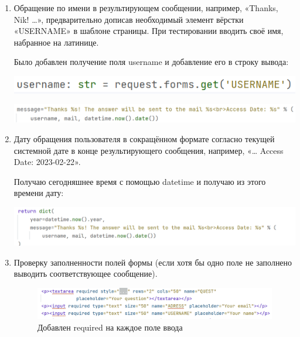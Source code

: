 \documentclass[14pt]{extarticle}
\begin{document}
\begin{enumerate}
\begin{enumerate}
\item Обращение по имени в результирующем сообщении, например, «Thanks, Nik! …»,
предварительно дописав необходимый элемент вёрстки «USERNAME» в шаблоне страницы.
При тестировании вводить своё имя, набранное на латинице.

Было добавлен получение поля username и добавление его в строку вывода:

\begin{center}
\includegraphics[width=.9\linewidth]{images/2023-04-12_10-17-27_screenshot.png}
\end{center}
\begin{center}
\includegraphics[width=.9\linewidth]{images/2023-04-12_10-17-16_screenshot.png}
\end{center}

\item Дату обращения пользователя в сокращённом формате согласно текущей системной дате в конце результирующего сообщения, например, «… Access Date: 2023-02-22».

Получаю сегодняшнее время с помощью datetime и получаю из этого времени дату:

\begin{center}
\includegraphics[width=.9\linewidth]{images/2023-04-12_10-18-37_screenshot.png}
\end{center}

\item Проверку заполненности полей формы (если хотя бы одно поле не заполнено выводить соответствующее сообщение).

\begin{figure}[H]
\centering
\includegraphics[width=.9\linewidth]{images/2023-04-12_10-14-53_screenshot.png}
\caption{Добавлен required на каждое поле ввода}
\end{figure}
\end{enumerate}
\end{enumerate}
\end{document}
